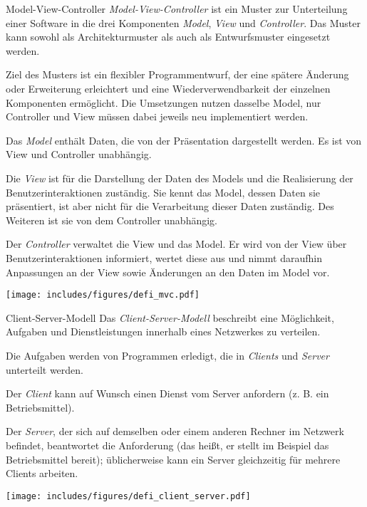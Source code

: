 \begin{defi}{Model-View-Controller}
    \emph{Model-View-Controller}  ist ein Muster zur Unterteilung einer Software in die drei Komponenten \emph{Model}, \emph{View} und \emph{Controller}.
    Das Muster kann sowohl als Architekturmuster als auch als Entwurfsmuster eingesetzt werden.

    Ziel des Musters ist ein flexibler Programmentwurf, der eine spätere Änderung oder Erweiterung erleichtert und eine Wiederverwendbarkeit der einzelnen Komponenten ermöglicht.
    Die Umsetzungen nutzen dasselbe Model, nur Controller und View müssen dabei jeweils neu implementiert werden.

    Das \emph{Model} enthält Daten, die von der Präsentation dargestellt werden.
    Es ist von View und Controller unabhängig.

    Die \emph{View} ist für die Darstellung der Daten des Models und die Realisierung der Benutzerinteraktionen zuständig.
    Sie kennt das Model, dessen Daten sie präsentiert, ist aber nicht für die Verarbeitung dieser Daten zuständig.
    Des Weiteren ist sie von dem Controller unabhängig.

    Der \emph{Controller} verwaltet die View und das Model.
    Er wird von der View über Benutzerinteraktionen informiert, wertet diese aus und nimmt daraufhin Anpassungen an der View sowie Änderungen an den Daten im Model vor.

    \begin{center}
        \texttt{[image: includes/figures/defi\_mvc.pdf]}
    \end{center}
\end{defi}

\begin{defi}{Client-Server-Modell}
    Das \emph{Client-Server-Modell} beschreibt eine Möglichkeit, Aufgaben und Dienstleistungen innerhalb eines Netzwerkes zu verteilen.

    Die Aufgaben werden von Programmen erledigt, die in \emph{Clients} und \emph{Server} unterteilt werden.

    Der \emph{Client} kann auf Wunsch einen Dienst vom Server anfordern (z. B. ein Betriebsmittel).

    Der \emph{Server}, der sich auf demselben oder einem anderen Rechner im Netzwerk befindet, beantwortet die Anforderung (das heißt, er stellt im Beispiel das Betriebsmittel bereit); üblicherweise kann ein Server gleichzeitig für mehrere Clients arbeiten.

    \begin{center}
        \texttt{[image: includes/figures/defi\_client\_server.pdf]}
    \end{center}
\end{defi}